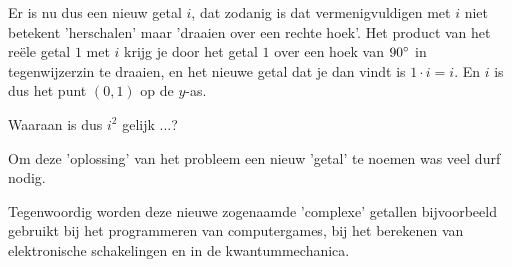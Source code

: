 \documentclass{ximera}
\begin{document}
\begin{image}[0.8\textwidth]
\end{image}



Er is nu dus een nieuw getal $i$, dat zodanig is dat vermenigvuldigen met $i$ niet betekent 'herschalen' maar 'draaien over een rechte hoek'.
Het product van het reële getal $1$ met $i$ krijg je door het getal $1$ over een hoek van $90^\circ$ in tegenwijzerzin te draaien, en het nieuwe getal dat je dan vindt is $1\cdot i=i$. 
En $i$ is dus het punt $(0,1)$ op de $y$-as. 

\begin{denkvraag*}{}
	Waaraan is dus $i^2$ gelijk ...?
\end{denkvraag*}

Om deze 'oplossing' van het probleem een nieuw 'getal' te noemen was veel durf nodig.



Tegenwoordig worden deze nieuwe zogenaamde 'complexe' getallen bijvoorbeeld gebruikt bij het programmeren van computergames, bij het berekenen van elektronische schakelingen en in de kwantummechanica.

\onlyOnline{
\end{expandable}
}




\end{document}
